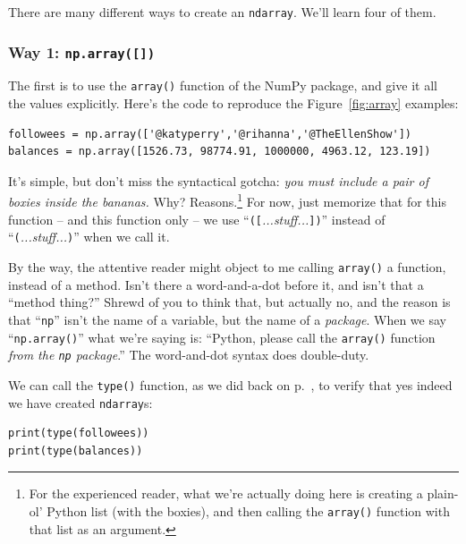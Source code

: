 There are many different ways to create an \texttt{ndarray}. We'll learn four
of them.

\subsubsection{Way 1: \texttt{np.array([])}}

\label{arrayFunction}

The first is to use the \texttt{array()} function of the NumPy package, and
give it all the values explicitly. Here's the code to reproduce the
Figure~\ref{fig:array} examples:

\begin{Verbatim}[fontsize=\scriptsize,samepage=true,frame=single,framesep=3mm]
followees = np.array(['@katyperry','@rihanna','@TheEllenShow'])
balances = np.array([1526.73, 98774.91, 1000000, 4963.12, 123.19])
\end{Verbatim}

It's simple, but don't miss the syntactical gotcha: \textit{you must include a
pair of boxies inside the bananas.} Why? Reasons.\footnote{For the experienced
reader, what we're actually doing here is creating a plain-ol' Python list
(with the boxies), and then calling the \texttt{array()} function with that
list as an argument.} For now, just memorize that for this function -- and this
function only -- we use ``\texttt{([}\textsl{...stuff...}\texttt{])}'' instead
of ``\texttt{(}\textsl{...stuff...}\texttt{)}'' when we call it.

By the way, the attentive reader might object to me calling \texttt{array()} a
function, instead of a method. Isn't there a word-and-a-dot before it, and
isn't that a ``method thing?'' Shrewd of you to think that, but actually no,
and the reason is that ``\texttt{np}'' isn't the name of a variable, but the
name of a \textit{package}. When we say ``\texttt{np.array()}'' what we're
saying is: ``Python, please call the \texttt{array()} function \textit{from the
\texttt{np} package}.'' The word-and-dot syntax does double-duty.

\label{arrayType}
We can call the \texttt{type()} function, as we did back on
p.~\pageref{typeFunction}, to verify that yes indeed we have created
\texttt{ndarray}s:

\begin{Verbatim}[fontsize=\small,samepage=true,frame=single,framesep=3mm]
print(type(followees))
print(type(balances))
\end{Verbatim}

